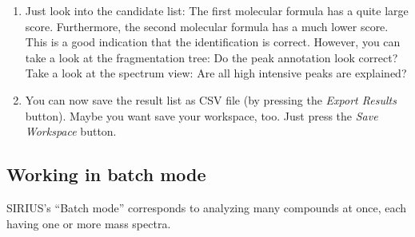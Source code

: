 \documentclass[letterpaper,10pt,openany,oneside]{sphinxmanual}
\newcommand\gui[1]{\textsl{\guilsinglleft#1\guilsinglright\xspace}}
\begin{document}
\begin{enumerate}
	\item {} 
	Just look into the candidate list: The first molecular formula has a quite large score. Furthermore, the second molecular formula has a much lower score. This is a good indication that the identification is correct. However, you can take a look at the fragmentation tree: Do the peak annotation look correct? Take a look at the spectrum view: Are all high intensive peaks are explained?
	
	\item {} 
	You can now save the result list as CSV file (by pressing the \gui{Export Results} button). Maybe you want save your workspace, too. Just press the \gui{Save Workspace} button.
	
\end{enumerate}


\subsection{Working in batch mode}

SIRIUS's ``Batch mode'' corresponds to analyzing many compounds at once,
each having one or more mass spectra.
\end{document}
